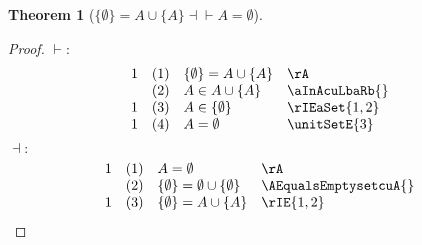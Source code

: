 \documentclass{book}
\theoremstyle{plain}
\newtheorem{theorem}{Theorem}
\theoremstyle{remark}
\theoremstyle{definition}
\begin{document}
\label{LbEmptysetRbEqualsAcuLbARbEqvAEqualsEmptyset}
\begin{theorem}[\(\{\emptyset\} = A \cup \{A\} \dashv\vdash A = \emptyset\)]
\end{theorem}
\begin{proof}
\(\vdash:\)
\[
\begin{array}{llll}
    1       & (1) & \{\emptyset\} = A \cup \{A\} & \rA \\
            & (2) & A\in A \cup \{A\} & \aInAcuLbaRb{} \\
    1       & (3) & A\in\{\emptyset\} & \rIEaSet{1,2} \\
    1       & (4) & A=\emptyset & \unitSetE{3} \\
\end{array}
\]
\(\dashv:\)
\[
\begin{array}{llll}
    1 & (1) & A = \emptyset & \rA \\
      & (2) & \{\emptyset\} = \emptyset\cup\{\emptyset\} & \AEqualsEmptysetcuA{} \\
    1 & (3) & \{\emptyset\} = A\cup\{A\} & \rIE{1,2} \\
\end{array}
\]

\end{proof}
\end{document}

